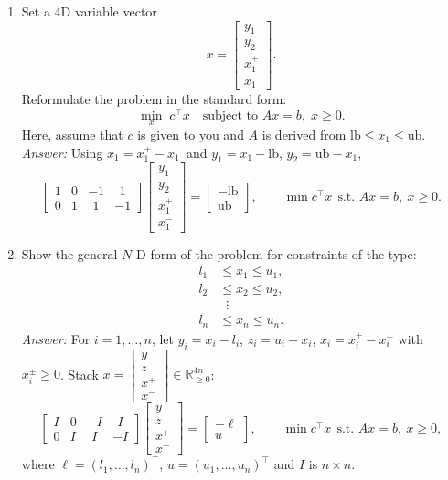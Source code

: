 \documentclass[11pt]{article}
\begin{document}
\begin{enumerate}[label=\textbf{2(\alph*)}]
\begin{enumerate}[label=\roman*)]
		\item Set a 4D variable vector
		\[
		x = \begin{bmatrix} y_1 \\ y_2 \\ x_1^{+} \\ x_1^{-} \end{bmatrix}.
		\]
		Reformulate the problem in the standard form:
		\begin{equation}
			\min_{x}\; c^{\top}x \quad \text{subject to } Ax = b, \; x \geq 0.
			\label{eq:stdform_1d}
		\end{equation}
		Here, assume that $c$ is given to you and $A$ is derived from $\text{lb} \leq x_1 \leq \text{ub}$.\\
		\emph{Answer:} Using $x_1=x_1^+-x_1^-$ and $y_1=x_1-\text{lb}$, $y_2=\text{ub}-x_1$,
		\[
		\begin{bmatrix}
			1 & 0 & -1 & \ \,1\\
			0 & 1 & \ \,1 & -1
		\end{bmatrix}
		\begin{bmatrix}y_1\\y_2\\x_1^+\\x_1^-\end{bmatrix}
		=
		\begin{bmatrix}-\text{lb}\\ \text{ub}\end{bmatrix},\qquad
		\min c^\top x\ \ \text{s.t. } Ax=b,\ x\ge 0.
		\]
		
		\item Show the general $N$-D form of the problem for constraints of the type:
		\[
		\begin{aligned}
			l_1 &\leq x_1 \leq u_1, \\
			l_2 &\leq x_2 \leq u_2, \\
			&\;\;\vdots \\
			l_n &\leq x_n \leq u_n.
		\end{aligned}
		\]
		\emph{Answer:} For $i=1,\dots,n$, let $y_i=x_i-l_i$, $z_i=u_i-x_i$, $x_i=x_i^+-x_i^-$ with $x_i^\pm\ge 0$.
		Stack $x=\begin{bmatrix}y\\z\\x^+\\x^-\end{bmatrix}\in\mathbb{R}^{4n}_{\ge 0}$:
		\[
		\begin{bmatrix}
			I & 0 & -I & \ \,I\\
			0 & I & \ \,I & -I
		\end{bmatrix}
		\begin{bmatrix}y\\z\\x^+\\x^-\end{bmatrix}
		=
		\begin{bmatrix}-\ell\\ u\end{bmatrix},\qquad
		\min c^\top x\ \ \text{s.t. } Ax=b,\ x\ge 0,
		\]
		where $\ell=(l_1,\dots,l_n)^\top$, $u=(u_1,\dots,u_n)^\top$ and $I$ is $n\times n$.
	\end{enumerate}
	

\end{enumerate}
\end{document}

